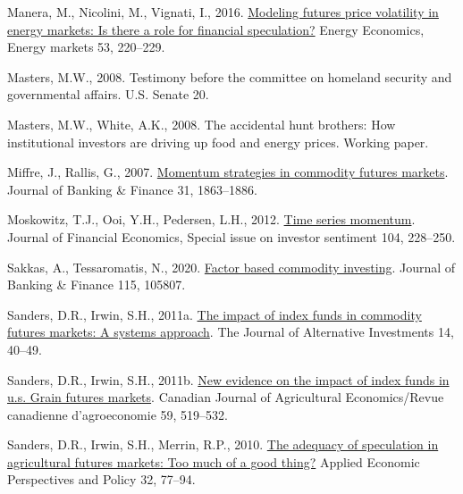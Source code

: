 \documentclass[]{elsarticle} %
\newlength{\cslhangindent}
\newlength{\cslentryspacingunit} %
\newenvironment{CSLReferences}[2] %
 {%
  \setlength{\parindent}{0pt}
  \ifodd #1
  \let\oldpar\par
  \def\par{\hangindent=\cslhangindent\oldpar}
  \fi
  \setlength{\parskip}{#2\cslentryspacingunit}
 }%
 {}
\begin{document}
\begin{CSLReferences}{1}{0}
\leavevmode{}%
Manera, M., Nicolini, M., Vignati, I., 2016. \href{https://doi.org/10.1016/j.eneco.2014.07.001}{Modeling futures price volatility in energy markets: Is there a role for financial speculation?} Energy Economics, Energy markets 53, 220--229.

\leavevmode{}%
Masters, M.W., 2008. Testimony before the committee on homeland security and governmental affairs. U.S. Senate 20.

\leavevmode{}%
Masters, M.W., White, A.K., 2008. The accidental hunt brothers: How institutional investors are driving up food and energy prices. Working paper.

\leavevmode{}%
Miffre, J., Rallis, G., 2007. \href{https://doi.org/10.1016/j.jbankfin.2006.12.005}{Momentum strategies in commodity futures markets}. Journal of Banking \& Finance 31, 1863--1886.

\leavevmode{}%
Moskowitz, T.J., Ooi, Y.H., Pedersen, L.H., 2012. \href{https://doi.org/10.1016/j.jfineco.2011.11.003}{Time series momentum}. Journal of Financial Economics, Special issue on investor sentiment 104, 228--250.

\leavevmode{}%
Sakkas, A., Tessaromatis, N., 2020. \href{https://doi.org/10.1016/j.jbankfin.2020.105807}{Factor based commodity investing}. Journal of Banking \& Finance 115, 105807.

\leavevmode{}%
Sanders, D.R., Irwin, S.H., 2011a. \href{https://doi.org/10.3905/jai.2011.14.1.040}{The impact of index funds in commodity futures markets: A systems approach}. The Journal of Alternative Investments 14, 40--49.

\leavevmode{}%
Sanders, D.R., Irwin, S.H., 2011b. \href{https://doi.org/10.1111/j.1744-7976.2011.01226.x}{New evidence on the impact of index funds in u.s. Grain futures markets}. Canadian Journal of Agricultural Economics/Revue canadienne d'agroeconomie 59, 519--532.

\leavevmode{}%
Sanders, D.R., Irwin, S.H., Merrin, R.P., 2010. \href{https://doi.org/10.1093/aepp/ppp006}{The adequacy of speculation in agricultural futures markets: Too much of a good thing?} Applied Economic Perspectives and Policy 32, 77--94.


\end{CSLReferences}
\end{document}

